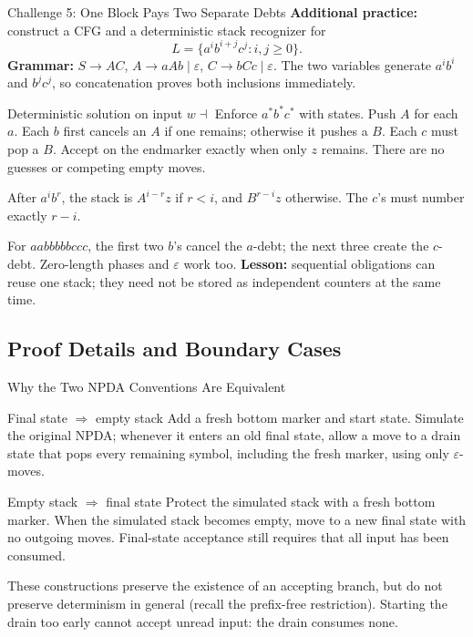 \documentclass[10pt]{beamer}
\begin{document}
\begin{frame}{Challenge 5: One Block Pays Two Separate Debts}
  \small
  \textbf{Additional practice:} construct a CFG and a deterministic
  stack recognizer for
  \[
    L=\{a^i b^{i+j}c^j:i,j\ge0\}.
  \]
  \pause
  \textbf{Grammar:}
  $S\to AC$, $A\to aAb\mid\varepsilon$, $C\to bCc\mid\varepsilon$.
  The two variables generate $a^ib^i$ and $b^jc^j$, so concatenation
  proves both inclusions immediately.
  \pause
  \begin{block}{Deterministic solution on input $w\dashv$}
    Enforce $a^*b^*c^*$ with states. Push $A$ for each $a$. Each $b$
    first cancels an $A$ if one remains; otherwise it pushes a $B$.
    Each $c$ must pop a $B$. Accept on the endmarker exactly when only
    $z$ remains. There are no guesses or competing empty moves.
  \end{block}
  After $a^ib^r$, the stack is $A^{i-r}z$ if $r<i$, and $B^{r-i}z$
  otherwise. The $c$'s must number exactly $r-i$.
  \pause
  \par\smallskip
  For $aabbbbbccc$, the first two $b$'s cancel the $a$-debt; the next
  three create the $c$-debt. Zero-length phases and $\varepsilon$ work too.
  \textbf{Lesson:} sequential obligations can reuse one stack; they need
  not be stored as independent counters at the same time.
\end{frame}

\subsection{Proof Details and Boundary Cases}

\begin{frame}{Why the Two NPDA Conventions Are Equivalent}
  \small
  \begin{block}{Final state $\Rightarrow$ empty stack}
    Add a fresh bottom marker and start state. Simulate the original NPDA; whenever it enters an old
    final state, allow a move to a drain state that pops every remaining
    symbol, including the fresh marker, using only $\varepsilon$-moves.
  \end{block}
  \pause
  \begin{block}{Empty stack $\Rightarrow$ final state}
    Protect the simulated stack with a fresh bottom marker. When the simulated stack becomes empty,
    move to a new final state with no outgoing moves. Final-state acceptance
    still requires that all input has been consumed.
  \end{block}
  These constructions preserve the existence of an accepting branch, but
  do not preserve determinism in general (recall the prefix-free restriction).
  Starting the drain too early cannot accept unread input: the drain consumes none.
\end{frame}
\end{document}

